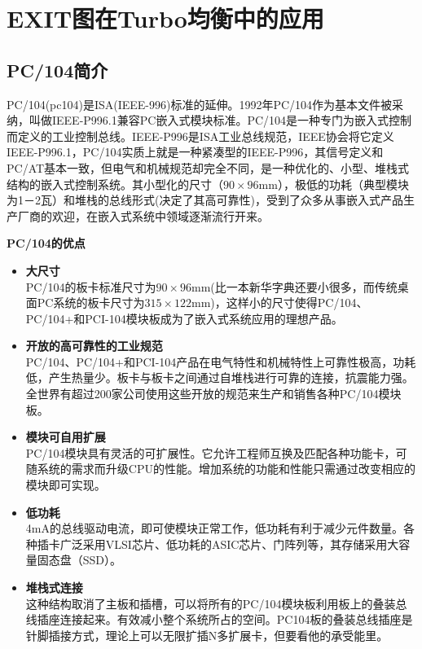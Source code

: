 %
\chapter{EXIT图在Turbo均衡中的应用}
\thispagestyle{empty}
\section{PC/104简介}
PC/104(pc104)是ISA(IEEE-996)标准的延伸。1992年PC/104作为基本文件被采纳，叫做IEEE-P996.1兼容PC嵌入式模块标准。PC/104是一种专门为嵌入式控制而定义的工业控制总线。IEEE-P996是ISA工业总线规范，IEEE协会将它定义IEEE-P996.1，PC/104实质上就是一种紧凑型的IEEE-P996，其信号定义和PC/AT基本一致，但电气和机械规范却完全不同，是一种优化的、小型、堆栈式结构的嵌入式控制系统。其小型化的尺寸（$90\times 96$mm），极低的功耗（典型模块为1－2瓦）和堆栈的总线形式(决定了其高可靠性)，受到了众多从事嵌入式产品生产厂商的欢迎，在嵌入式系统中领域逐渐流行开来。

\textbf{\xiaosan PC/104的优点}
\begin{itemize}
  \item\textbf{\xiaosi 大尺寸}\\
    PC/104的板卡标准尺寸为$90\times 96$mm(比一本新华字典还要小很多，而传统桌面PC系统的板卡尺寸为$315\times 122$mm)，这样小的尺寸使得PC/104、PC/104+和PCI-104模块板成为了嵌入式系统应用的理想产品。
  \item\textbf{\xiaosi 开放的高可靠性的工业规范}\\ PC/104、PC/104+和PCI-104产品在电气特性和机械特性上可靠性极高，功耗低，产生热量少。板卡与板卡之间通过自堆栈进行可靠的连接，抗震能力强。全世界有超过200家公司使用这些开放的规范来生产和销售各种PC/104模块板。
  \item\textbf{\xiaosi 模块可自用扩展}\\ PC/104模块具有灵活的可扩展性。它允许工程师互换及匹配各种功能卡，可随系统的需求而升级CPU的性能。增加系统的功能和性能只需通过改变相应的模块即可实现。
  \item\textbf{\xiaosi 低功耗}\\ 4mA的总线驱动电流，即可使模块正常工作，低功耗有利于减少元件数量。各种插卡广泛采用VLSI芯片、低功耗的ASIC芯片、门阵列等，其存储采用大容量固态盘（SSD）。
  \item\textbf{\xiaosi 堆栈式连接}\\ 这种结构取消了主板和插槽，可以将所有的PC/104模块板利用板上的叠装总线插座连接起来。有效减小整个系统所占的空间。PC104板的叠装总线插座是针脚插接方式，理论上可以无限扩插N多扩展卡，但要看他的承受能里。
\end{itemize}
